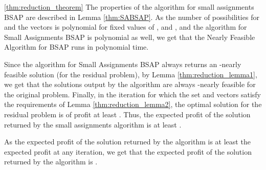 \documentclass[11pt]{article}
\newenvironment{dl_proof}[1]{\noindent{\bf Proof of Lemma #1:}}{
 \hspace*{\fill}  \vskip \belowdisplayskip}
\begin{document}
{\begin{dl_proof}{\ref{thm:reduction_theorem}}
The properties of the algorithm for small assignments BSAP are
described in Lemma \ref{thm:SABSAP}. As the number of
possibilities for  and the vectors  is polynomial for
fixed values of , and , and the algorithm for
Small Assignments BSAP is polynomial as well, we get that the
Nearly Feasible Algorithm  for BSAP runs in polynomial time.

Since the algorithm for Small Assignments BSAP always returns an
 -nearly feasible solution
(for the residual problem),
by Lemma \ref{thm:reduction_lemma1}, we get that the solutions output
 by the algorithm
are always -nearly feasible for the original problem.
Finally, in the iteration for which the set  and vectors  satisfy the
requirements of Lemma \ref{thm:reduction_lemma2}, the optimal solution for the
residual problem is of profit at least .
Thus, the expected profit of the solution returned by the small assignments algorithm is
at least .

As the expected profit of the solution returned  by the algorithm is at least the
expected profit at any iteration, we get that the expected profit
of the solution returned by the algorithm is .
\end{dl_proof}
}
\end{document}
